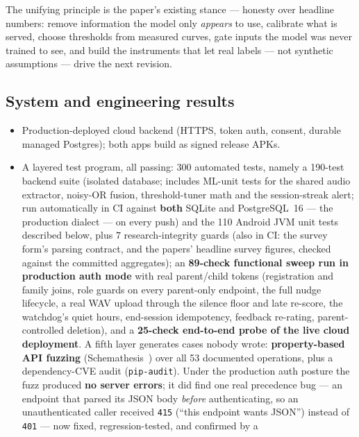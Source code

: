 \documentclass[11pt,a4paper]{article}
\begin{document}
The unifying principle is the paper's existing stance --- honesty over headline
numbers: remove information the model only \emph{appears} to use, calibrate what is
served, choose thresholds from measured curves, gate inputs the model was never
trained to see, and build the instruments that let real labels --- not synthetic
assumptions --- drive the next revision.

\subsection{System and engineering results}
\begin{itemize}[leftmargin=1.4em]
  \item Production-deployed cloud backend (HTTPS, token auth, consent, durable
        managed Postgres); both apps build as signed release APKs.
  \item A layered test program, all passing: $300$ automated tests, namely a
        190-test backend suite (isolated database; includes ML-unit tests for the
        shared audio extractor, noisy-OR fusion, threshold-tuner math and the
        session-streak alert; run automatically in CI against \textbf{both} SQLite
        and PostgreSQL~16 --- the production dialect --- on every push) and the 110
        Android JVM unit tests described below, plus $7$ research-integrity guards
        (also in CI: the survey form's parsing contract, and the papers' headline
        survey figures, checked against the committed aggregates); an
        \textbf{89-check functional sweep run in production auth mode} with real
        parent/child tokens (registration and family joins, role guards on every
        parent-only endpoint, the full nudge lifecycle, a real WAV upload through the
        silence floor and late re-score, the watchdog's quiet hours, end-session
        idempotency, feedback re-rating, parent-controlled deletion), and a
        \textbf{25-check end-to-end probe of the live cloud deployment}. A fifth layer
        generates cases nobody wrote: \textbf{property-based API fuzzing}
        (Schemathesis~\cite{schemathesis}) over all 53 documented operations, plus a
        dependency-CVE audit (\texttt{pip-audit}). Under the production auth posture the
        fuzz produced \textbf{no server errors}; it did find one real precedence
        bug --- an endpoint that parsed its JSON body \emph{before} authenticating, so
        an unauthenticated caller received \texttt{415} (``this endpoint wants JSON'')
        instead of \texttt{401} --- now fixed, regression-tested, and confirmed by a

\end{itemize}
\end{document}
